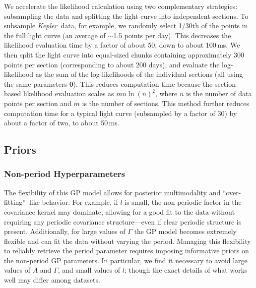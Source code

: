 \documentclass[a4paper,fleqn,usenatbib,useAMS]{mnras}
\newcommand{\Kepler}{{\it Kepler}}
\begin{document}
We accelerate the likelihood calculation using two complementary strategies:
subsampling the data and splitting the light curve into independent sections.
To subsample \Kepler\ data, for example,
we randomly select 1/30th of the points
in the full light curve (an average of $\sim$1.5 points per day).
This decreases the likelihood evaluation time by a factor of about 50, down to
about 100\,ms.
We then split the light curve into equal-sized chunks containing approximately
300 points per section (corresponding to about 200 days), and evaluate the
log-likelihood as the sum of the log-likelihoods of the individual sections
(all using the same parameters ${\bm \theta}$).
This reduces computation time because the section-based likelihood evaluation
scales as $mn\ln(n)^2$, where $n$ is the number of data points per section and
$m$ is the number of sections.
This method further reduces computation time for a typical light curve
(subsampled by a factor of 30) by about a factor of two, to about 50\,ms.

\subsection{Priors}
\label{sec:GP_prior}

\subsubsection{Non-period Hyperparameters}
\label{sec:nonperiod_prior}

The flexibility of this GP model allows for posterior multimodality and
``over-fitting''--like behavior.
For example, if $l$ is small, the non-periodic factor in the covariance
kernel may dominate, allowing for a good fit to the data without
requiring any periodic covariance structure---even if clear periodic
structure is present.
Additionally, for large values of $\Gamma$ the GP model becomes extremely
flexible and can fit the data without varying the period.
Managing this flexibility to reliably retrieve the period parameter requires
imposing informative priors on the non-period GP parameters.
In particular, we find it necessary to avoid large values of
$A$ and $\Gamma$, and small values of $l$; though the exact details of what
works well may differ among datasets.
\end{document}
